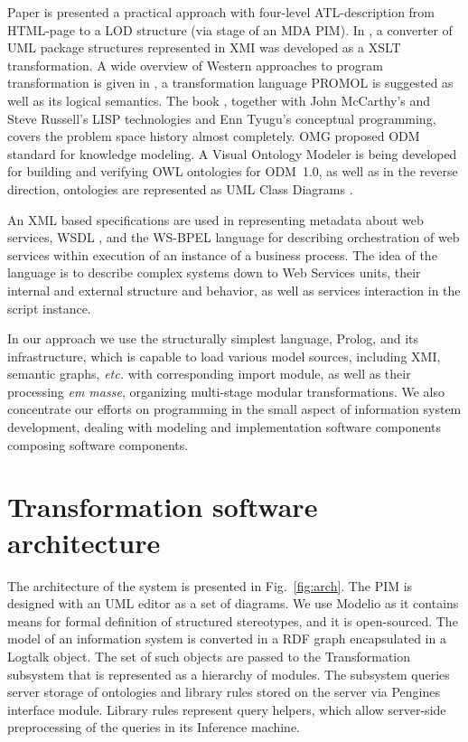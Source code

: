 \documentclass[runningheads]{llncs}
\begin{document}
Paper \cite{Malki} is presented a practical approach with four-level ATL-description from HTML-page to a LOD structure (via stage of an MDA PIM). In \cite{uml2owl}, a converter of UML package structures represented in XMI was developed as a XSLT transformation. A wide overview of Western approaches to program transformation is given in \cite{Dama,Dama2}, a transformation language PROMOL is suggested as well as its logical semantics. The book \cite{Dama}, together with John McCarthy's and Steve Russell's LISP technologies and Enn Tyugu's conceptual programming, covers the problem space history almost completely. OMG proposed ODM standard \cite{odmprof} for knowledge modeling.  A Visual Ontology Modeler \cite{odnext} is being developed for building and verifying OWL ontologies for ODM~1.0, as well as in the reverse direction, ontologies are represented as UML Class Diagrams \cite{odmvis}.

An XML based specifications are used in representing metadata about web services, WSDL \cite{wsdl}, and the WS-BPEL language \cite{wsbpel} for describing orchestration of web services within execution of an instance of a business process.  The idea of the language is to describe complex systems down to Web Services units, their internal and external structure and behavior, as well as services interaction in the script instance.

In our approach we use the structurally simplest language, Prolog, and its infrastructure, which is capable to load various model sources, including XMI, semantic graphs, \emph{etc.} with corresponding import module, as well as their processing \emph{em masse}, organizing multi-stage modular transformations. We also concentrate our efforts on programming in the small aspect of information system development, dealing with modeling and implementation software components composing software components.

\section{Transformation software architecture}
\label{sec:arch}

The architecture of the system is presented in Fig.~\ref{fig:arch}.  The PIM is designed with an UML editor as a set of diagrams.  We use Modelio \cite{modelio} as it contains means for formal definition of structured stereotypes, and it is open-sourced.  The model of an information system is converted in a RDF graph encapsulated in a Logtalk object.  The set of such objects are passed to the Transformation subsystem that is represented as a hierarchy of modules.  The subsystem queries server storage of ontologies and library rules stored on the server via Pengines interface module.  Library rules represent query helpers, which allow server-side preprocessing of the queries in its Inference machine.
\end{document}

